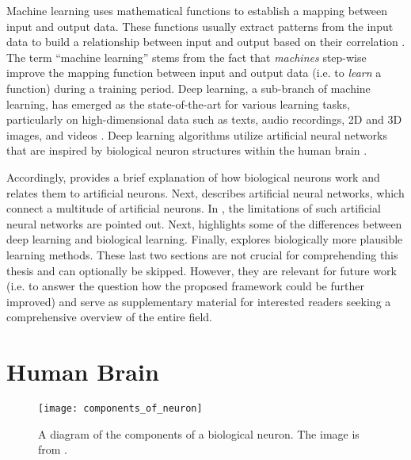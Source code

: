 Machine learning uses mathematical functions to establish a mapping between input and output data.
These functions usually extract patterns from the input data to build a relationship between input and output based on their correlation \cite{mitchell_machine_1997}.
The term ``machine learning'' stems from the fact that \emph{machines} step-wise improve the mapping function between input and output data (i.e. to \emph{learn} a function) during a training period.
Deep learning, a sub-branch of machine learning, has emerged as the state-of-the-art for various learning tasks, particularly on high-dimensional data such as texts, audio recordings, 2D and 3D images, and videos \cite{lecun_deep_2015}.
Deep learning algorithms utilize artificial neural networks that are inspired by biological neuron structures within the human brain \cite{bain_mind_1873, james_principles_1890}.

Accordingly,  provides a brief explanation of how biological neurons work and relates them to artificial neurons.
Next,  describes artificial neural networks, which connect a multitude of artificial neurons.
In , the limitations of such artificial neural networks are pointed out.
Next,  highlights some of the differences between deep learning and biological learning. Finally,  explores biologically more plausible learning methods.
These last two sections are not crucial for comprehending this thesis and can optionally be skipped. However, they are relevant for future work (i.e. to answer the question how the proposed framework could be further improved) and serve as supplementary material for interested readers seeking a comprehensive overview of the entire field.

\section{Human Brain}
\begin{figure}[h]
    \centering
    \texttt{[image: components\_of\_neuron]}
    \caption[Diagram of the components of a biological neuron]{A diagram of the components of a biological neuron. The image is from .}
\end{figure}

